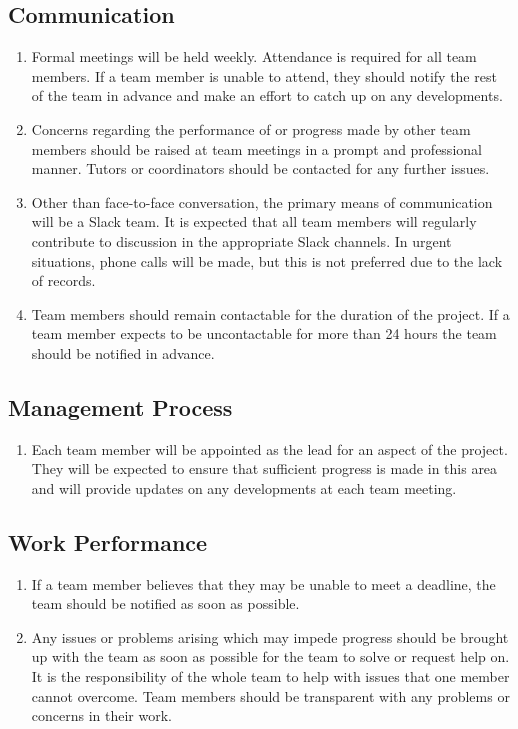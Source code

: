 \documentclass[a4paper]{article}
\begin{document}
\subsection{Communication}
\begin{enumerate}[label=(\alph*)]
	\item Formal meetings will be held weekly. Attendance is required for all team members. If a team member is unable to attend, they should notify the rest of the team in advance and make an effort to catch up on any developments.
	\item Concerns regarding the performance of or progress made by other team members should be raised at team meetings in a prompt and professional manner. Tutors or coordinators should be contacted for any further issues.
	\item Other than face-to-face conversation, the primary means of communication will be a Slack team. It is expected that all team members will regularly contribute to discussion in the appropriate Slack channels. In urgent situations, phone calls will be made, but this is not preferred due to the lack of records.
	\item Team members should remain contactable for the duration of the project. If a team member expects to be uncontactable for more than 24 hours the team should be notified in advance.

\end{enumerate}

\subsection{Management Process}
\begin{enumerate}[label=(\alph*)]
	\item Each team member will be appointed as the lead for an aspect of the project. They will be expected to ensure that sufficient progress is made in this area and will provide updates on any developments at each team meeting. 
\end{enumerate}

\subsection{Work Performance}
\begin{enumerate}[label=(\alph*)]
	\item If a team member believes that they may be unable to meet a deadline, the team should be notified as soon as possible.
	\item Any issues or problems arising which may impede progress should be brought up with the team as soon as possible for the team to solve or request help on. It is the responsibility of the whole team to help with issues that one member cannot overcome. Team members should be transparent with any problems or concerns in their work.
\end{enumerate}
\end{document}
